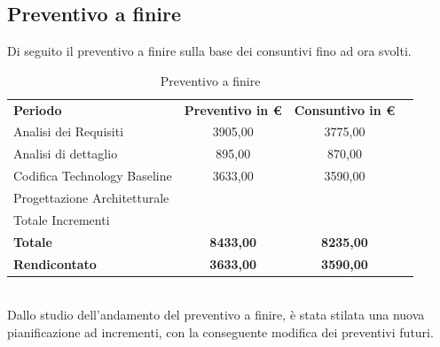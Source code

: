 \subsection{Preventivo a finire}
Di seguito il preventivo a finire sulla base dei consuntivi fino ad ora svolti.
\begin{table} [h!]
	\begin{center}
		\begin{tabular} { m{8 cm} c c c  }
			\rowcolor{lightgray}
			\textbf{Periodo}  & \textbf{Preventivo in \euro} & \textbf{Consuntivo in \euro} \\
			Analisi dei Requisiti   			& 3905,00     & 3775,00 \\
			Analisi di dettaglio  				& 895,00     & 870,00 \\
			Codifica Technology Baseline        & 3633,00     & 3590,00 \\
			Progettazione Architetturale\\
			Totale Incrementi\\
			\textbf{Totale}     & \textbf{8433,00}         & \textbf{8235,00}   \\
			\textbf{Rendicontato}  & \textbf{3633,00}          & \textbf{3590,00}   \\
			
			
		\end{tabular}
		\caption{Preventivo a finire }
	\end{center}
\end{table}
 \\
Dallo studio dell'andamento del preventivo a finire, è stata stilata una nuova pianificazione ad incrementi, con la conseguente modifica dei preventivi futuri.